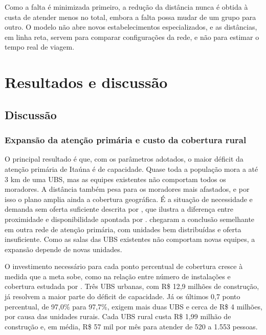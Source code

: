 \documentclass[12pt,a4paper,oneside]{report}
\begin{document}
Como a falta é minimizada primeiro, a redução da distância nunca é obtida à custa de atender menos no
total, embora a falta possa mudar de um grupo para outro. O modelo não abre novos estabelecimentos
especializados, e as distâncias, em linha reta, servem para comparar configurações da rede, e não para
estimar o tempo real de viagem.



\chapter{Resultados e discussão}


\section{Discussão}\label{sec:discussao}

\subsection{Expansão da atenção primária e custo da cobertura rural}
O principal resultado é que, com os parâmetros adotados, o maior déficit da atenção primária de Itaúna é de
capacidade. Quase toda a população mora a até 3 km de uma UBS, mas as equipes
existentes não comportam todos os moradores. A distância também pesa para os moradores mais afastados, e por
isso o plano amplia ainda a cobertura geográfica. É a situação de necessidade e demanda sem oferta suficiente
descrita por \citet{santana2023}, que ilustra a diferença entre proximidade e disponibilidade apontada por
\citet{guagliardo2004}. \citet{elorza2022} chegaram a conclusão semelhante em outra rede de atenção
primária, com unidades bem distribuídas e oferta insuficiente. Como as salas das UBS existentes não
comportam novas equipes, a expansão depende de novas unidades.

O investimento necessário para cada ponto percentual de cobertura cresce à medida que a meta sobe, como
na relação entre número de instalações e cobertura estudada por \citet{church1974}. Três UBS urbanas, com
R\$ 12,9 milhões de construção, já resolvem a maior parte do déficit de capacidade. Já os últimos 0,7
ponto percentual, de 97,0\% para 97,7\%, exigem mais duas UBS e cerca de R\$ 4 milhões, por causa das
unidades rurais. Cada UBS rural custa R\$ 1,99 milhão de construção e, em média, R\$ 57 mil por mês para
atender de 520 a 1.553 pessoas.
\end{document}
